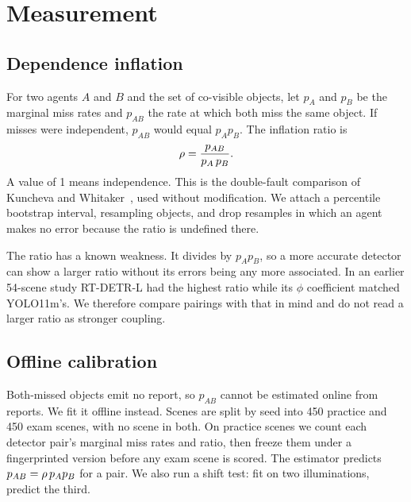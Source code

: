 \section{Measurement}

\subsection{Dependence inflation}
For two agents $A$ and $B$ and the set of co-visible objects, let $p_A$ and
$p_B$ be the marginal miss rates and $p_{AB}$ the rate at which both miss the
same object. If misses were independent, $p_{AB}$ would equal $p_A p_B$. The
inflation ratio is
\begin{equation}
  \rho = \frac{p_{AB}}{p_A\,p_B}.
\end{equation}
A value of 1 means independence. This is the double-fault comparison of
Kuncheva and Whitaker~\cite{kuncheva2003}, used without modification. We
attach a percentile bootstrap interval, resampling objects, and drop
resamples in which an agent makes no error because the ratio is undefined
there.

The ratio has a known weakness. It divides by $p_A p_B$, so a more accurate
detector can show a larger ratio without its errors being any more associated.
In an earlier 54-scene study RT-DETR-L had the highest ratio while its $\phi$
coefficient matched YOLO11m's. We therefore compare pairings with that in
mind and do not read a larger ratio as stronger coupling.

\subsection{Offline calibration}
Both-missed objects emit no report, so $p_{AB}$ cannot be estimated online from
reports. We fit it offline instead. Scenes are split by seed into 450
practice and 450 exam scenes, with no scene in both. On practice scenes we
count each detector pair's marginal miss rates and ratio, then freeze them
under a fingerprinted version before any exam scene is scored. The estimator
predicts $p_{AB}=\rho\,p_A p_B$ for a pair. We also run a shift test: fit on
two illuminations, predict the third.

